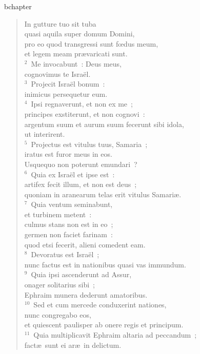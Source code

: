 bchapter\begin{verse}\vspace{-19pt}In gutture tuo sit tuba\\ quasi aquila super domum Domini,\\ pro eo quod transgressi sunt fœdus meum,\\ et legem meam pr\ae varicati sunt.\\
${}^{2}$~Me invocabunt~: Deus meus,\\ cognovimus te Isra\"el.\\
${}^{3}$~Projecit Isra\"el bonum~:\\ inimicus persequetur eum.\\
${}^{4}$~Ipsi regnaverunt, et non ex me~;\\ principes exstiterunt, et non cognovi~:\\ argentum suum et aurum suum fecerunt sibi idola,\\ ut interirent.\\
${}^{5}$~Projectus est vitulus tuus, Samaria~;\\ iratus est furor meus in eos.\\ Usquequo non poterunt emundari~?\\
${}^{6}$~Quia ex Isra\"el et ipse est~:\\ artifex fecit illum, et non est deus~;\\ quoniam in aranearum telas erit vitulus Samari\ae .\\
${}^{7}$~Quia ventum seminabunt,\\ et turbinem metent~:\\ culmus stans non est in eo~;\\ germen non faciet farinam~:\\ quod etsi fecerit, alieni comedent eam.\\
${}^{8}$~Devoratus est Isra\"el~;\\ nunc factus est in nationibus quasi vas immundum.\\
${}^{9}$~Quia ipsi ascenderunt ad Assur,\\ onager solitarius sibi~;\\ Ephraim munera dederunt amatoribus.\\
${}^{10}$~Sed et cum mercede conduxerint nationes,\\ nunc congregabo eos,\\ et quiescent paulisper ab onere regis et principum.\\
${}^{11}$~Quia multiplicavit Ephraim altaria ad peccandum~;\\ fact\ae\ sunt ei ar\ae\ in delictum.\\

\end{verse}
